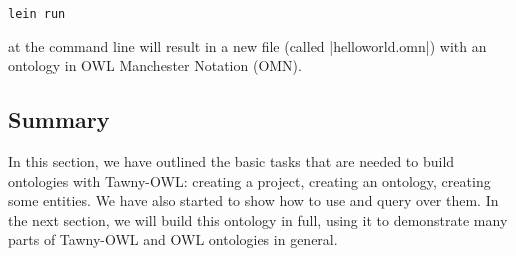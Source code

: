 \begin{verbatim}
lein run
\end{verbatim}

at the command line will result in a new file (called
|helloworld.omn|) with an ontology in OWL Manchester Notation (OMN).

\subsection{Summary}

In this section, we have outlined the basic tasks that are needed to
build ontologies with Tawny-OWL: creating a project, creating an
ontology, creating some entities. We have also started to show how to
use and query over them. In the next section, we will build this
ontology in full, using it to demonstrate many parts of Tawny-OWL and
OWL ontologies in general.

